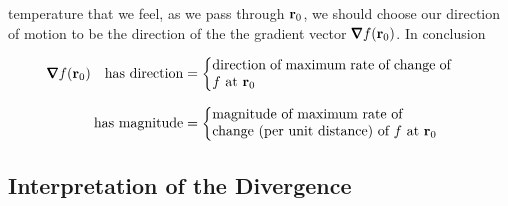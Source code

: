 temperature that we feel, as we pass through $\mathbf{r}_0$, we should
choose our direction of motion 
to be the direction of the the gradient vector $\vnabla f(\vr_0)$.
In conclusion
\begin{impeqn}\label{eq:gradInterp}
\begin{align*}
\vnabla f(\vr_0)
\quad\text{has direction}&=\left\{
       \parbox[c]{6.0cm}{direction of maximum rate
                           of change of $f$ at $\vr_0$}
                           \right. \\[0.1in]
\text{has magnitude}&=\left\{
       \parbox[c]{6.5cm}{magnitude of maximum rate of\\
                          change (per unit distance) of $f$ at $\vr_0$}
                           \right.
\end{align*}
\end{impeqn}





\subsection{Interpretation of the Divergence}\label{sec:divInterp}

